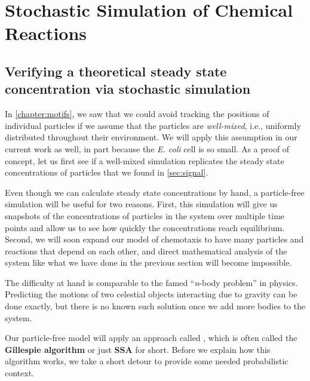 \FloatBarrier
{}

\section{Stochastic Simulation of Chemical Reactions}
\label{sec:stochastic_simulation_of_chemical_reactions}
\subsection{Verifying a theoretical steady state concentration via stochastic simulation}

In \autoref{chapter:motifs}, we saw that we could avoid tracking the positions of individual particles if we assume that the particles are \textit{well-mixed}, i.e., uniformly distributed throughout their environment. We will apply this assumption in our current work as well, in part because the \textit{E. coli} cell is so small. As a proof of concept, let us first see if a well-mixed simulation replicates the steady state concentrations of particles that we found in \autoref{sec:signal}.

Even though we can calculate steady state concentrations by hand, a particle-free simulation will be useful for two reasons. First, this simulation will give us snapshots of the concentrations of particles in the system over multiple time points and allow us to see how quickly the concentrations reach equilibrium. Second, we will soon expand our model of chemotaxis to have many particles and reactions that depend on each other, and direct mathematical analysis of the system like what we have done in the previous section will become impossible.

The difficulty at hand is comparable to the famed ``\textit{n}-body problem'' in physics. Predicting the motions of two celestial objects interacting due to gravity can be done exactly, but there is no known such solution once we add more bodies to the system.

Our particle-free model will apply an approach called , which is often called the \textbf{Gillespie algorithm} or just \textbf{SSA} for short. Before we explain how this algorithm works, we take a short detour to provide some needed probabilistic context.

